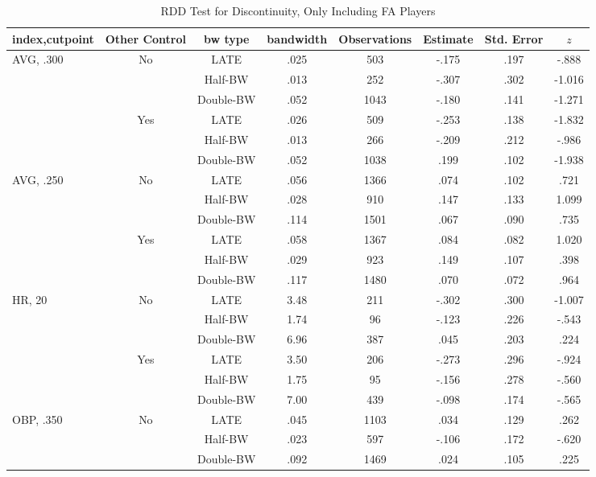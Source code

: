 \documentclass[dvipdfmx, 12pt]{article}
\begin{document}
\begin{table}[H]
  \caption{RDD Test for Discontinuity, Only Including FA Players}
  \label{RDD_B}
  \fontsize{9pt}{6pt}\selectfont
  \centering
  \begin{tabular}{@{\extracolsep{0pt}}lccccccc}\hline
    index,cutpoint & Other Control & bw type & bandwidth
    & Observations & Estimate & Std. Error & $z$
    \\ \hline \hline
    AVG, .300 & No &LATE & .025 & 503 & -.175 & .197 & -.888 \\
    & &Half-BW &  .013 & 252 & -.307 & .302 & -1.016 \\
    & & Double-BW & .052 & 1043  & -.180 & .141 & -1.271 \\ \cline{3-8}

    & Yes &LATE & .026 & 509 & -.253 & .138 & -1.832 \\
    & &Half-BW &  .013 & 266 & -.209 & .212 & -.986 \\
    & & Double-BW & .052 & 1038  & .199 & .102 & -1.938 \\ \hline

    AVG, .250 & No &LATE & .056 & 1366 & .074 & .102 & .721 \\
    & &Half-BW & .028 & 910 & .147 & .133 & 1.099 \\
    & & Double-BW & .114 & 1501  & .067 & .090 & .735 \\ \cline{3-8}

    & Yes &LATE & .058 & 1367 & .084 & .082 & 1.020 \\
    & &Half-BW & .029 & 923 & .149 & .107 & .398 \\
    & & Double-BW & .117 & 1480  & .070 & .072 & .964 \\ \hline

    HR, 20 & No & LATE & 3.48 & 211 & -.302 & .300 & -1.007 \\
    & & Half-BW & 1.74 & 96 & -.123 & .226 & -.543 \\
    & & Double-BW & 6.96 & 387 & .045 & .203 & .224 \\ \cline{3-8}

    & Yes & LATE & 3.50  & 206 & -.273 & .296 & -.924\\
    & & Half-BW & 1.75 & 95 & -.156 & .278 & -.560 \\
    & & Double-BW & 7.00 & 439 & -.098 & .174 & -.565 \\ \hline

    OBP, .350 & No &LATE & .045 & 1103 & .034 & .129 & .262 \\
    & & Half-BW & .023 & 597 & -.106 & .172 & -.620 \\
    & & Double-BW & .092 & 1469 & .024 & .105 & .225 \\ \cline{3-8}


\end{tabular}
\end{table}
\end{document}
